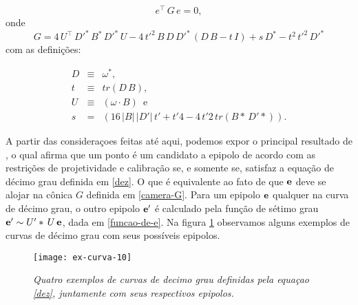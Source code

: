 \begin{equation}
e^\top\,G\,e=0,
\label{dez}
\end{equation}
onde 
\begin{equation}
G=4\,U^\top\,D'^*\,B^*\,D'^*\,U-4\,t'^2\,B\,D\,D'^*\,(D\,B-t\,I)+s\,D^*-t^2\,t'^2\,D'^*
\label{conica-G}
\end{equation}
com as definições:

\begin{equation}
\begin{array}{rcl}
D&\equiv&\omega^*,\\
t&\equiv&tr(D\,B),\\
U&\equiv&(\omega \cdot B)\,\,\, \text{e}\\
s&=&(16\,|B|\,|D'|\,t'+t'4-4\,t'2\,tr(B*\,D'*)).
\end{array}
\end{equation}

A partir das consideraçoes feitas até aqui, podemos expor o principal resultado de \cite{kneebone}, o qual afirma que um ponto é um candidato a epipolo de acordo com as restrições de projetividade e calibração se, e somente se, satisfaz a equação de décimo grau definida em \ref{dez}. O que é equivalente ao fato de que ${\bf e}$ deve se alojar na cônica $G$ definida em \ref{camera-G}. Para um epipolo ${\bf e}$ qualquer na curva de décimo grau, o outro epipolo ${\bf e'}$ é calculado pela função de sétimo grau ${\bf e'} \sim U'*\,U\,{\bf e}$, dada em \ref{funcao-de-e}. Na figura \ref{curva-10} observamos alguns exemplos de curvas de décimo grau com seus possíveis epipolos. 

\begin{figure}[!htb]
\centering
\texttt{[image: ex-curva-10]}
\caption{\textit{Quatro exemplos de curvas de decimo grau definidas pela equaçao \ref{dez}, juntamente com seus respectivos epipolos.}}
\label{curva-10}
\end{figure}

